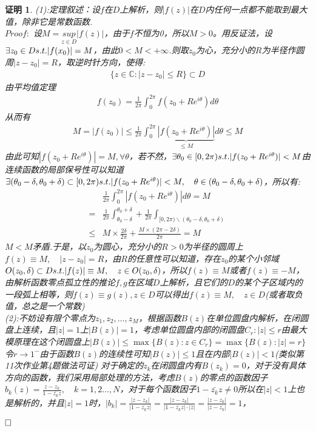 \documentclass{ctexart}
\newcommand{\。}{．} %
\newenvironment{lanse}{
    \begin{tcolorbox}[breakable,enhanced, colback=qlan, boxrule=0pt, frame hidden,
        borderline west={0.7mm}{0.1mm}{slan}]
    }
    {\end{tcolorbox}}
\theoremstyle{t} %
\newtheorem*{zmhj}{\color{slan} 证明}
\newenvironment{zm}{\begin{lanse}\begin{zmhj}}{$\hfill \square$\end{zmhj}\end{lanse}}
\begin{document}
\begin{zm}
    (1):定理叙述：设$f$在$D$上解析，则$|f(z)|$在$D$内任何一点都不能取到最大值，除非它是常数函数.\\
$Proof:$ 设$M=\underset{z\in D}{sup}|f(z)|$，由于$f$不恒为0，所以$M>0$。用反证法，设$\exists z_0\in D\space s.t. \space |f(x_0)|=M$，由此$0<M<+\infty$.则取$z_0$为心，充分小的$R$为半径作圆周$|z-z_0|=R$，取逆时针方向，使得:
\begin{align*}
    \{z\in \mathbb{C}:|z-z_0|\le R\}\subset D
\end{align*}
由平均值定理
\begin{align*}
    f(z_0)=\frac{1}{2\pi}\int_{0}^{2\pi}f(z_0+Re^{i\theta})d\theta
\end{align*}
从而有
\begin{align*}
    M=|f(z_0)|\le \frac{1}{2\pi}\int_{0}^{2\pi}\underbrace{|f(z_0+Re^{i\theta})|}_{\le M}d\theta\le M
\end{align*}
由此可知$|f(z_0+Re^{i\theta})|=M,\forall \theta$，若不然，$\exists \theta_0\in[0,2\pi)\space s.t.\space |f(z_0+Re^{i\theta})|< M$由连续函数的局部保号性可以知道$\exists (\theta_0-\delta,\theta_0+\delta)\subset [0,2\pi)\space s.t.\space |f(z_0+Re^{i\theta})|<M,\quad \theta\in(\theta_0-\delta,\theta_0+\delta)$，所以有:
\begin{align*}
    &\frac{1}{2\pi}\int_{0}^{2\pi}|f(z_0+Re^{i\theta})|d\theta=M\\
    =&\frac{1}{2\pi}\int_{\theta_0-\delta}^{\theta_0+\delta}+\frac{1}{2\pi}\int_{[0,2\pi)\backslash (\theta_0-\delta,\theta_0+\delta)}\\
    \le& M\times \frac{2\delta}{2\pi}+\frac{M\times (2\pi-2\delta)}{2\pi}=M
\end{align*}
$M<M$矛盾.于是，以$z_0$为圆心，充分小的$R>0$为半径的圆周上$f(z)\equiv M,\quad |z-z_0|=R$，由$R$的任意性可以知道，存在$z_0$的某个小邻域$O(z_0,\delta)\subset D\space s.t. \space |f(z)|\equiv M,\quad z\in O(z_0,\delta)$，所以$f(z)\equiv M$或者$f(z)\equiv -M$，由解析函数零点孤立性的推论$f,g$在区域$D$上解析，且它们的$D$的某个子区域内的一段弧上相等，则$f(z)\equiv g(z),z\in D$可以得出$f(z)\equiv M,\quad z\in D$(或者取负值，总之是一个常数)\\
(2):不妨设有限个零点为$z_1,z_2,\dots ,z_M$，根据函数$B(z)$在单位圆盘内解析，在闭圆盘上连续，且$|z|=1$上$|B(z)|=1$，考虑单位圆盘内部的闭圆盘$C_r:|z|\le r$由最大模原理在这个闭圆盘上$|B(z)|\le\max \{B(z):z\in C_r\}=\max \{B(z):|z|=r\}$令$r\to 1^-$由于函数$B(z)$的连续性可知$|B(z)|\le 1$且在内部$|B(z)|<1$(类似第11次作业第4题做法可证)
对于确定的$z_k$在闭圆盘内有$B(z_k)=0$，对于没有具体方向的函数，我们采用局部处理的方法，考虑$B(z)$的零点的函数因子$b_k(z)=\frac{z-z_k}{1-\bar{z_k}z},\quad k=1,2\dots,N$，对于每个函数因子$1-\bar{z_k}z\neq 0$所以在$|z|< 1$上也是解析的，并且$|z|=1$时，$|b_k|=\frac{|z-z_k|}{|1-\bar{z_k}z|}=\frac{|z-z_k|}{|1-\bar{z_k}z|\cdot |\bar{z}|}=\frac{|z-z_k|}{|\bar{z}-\bar{z_k}|}=1$，

\end{zm}
\end{document}
